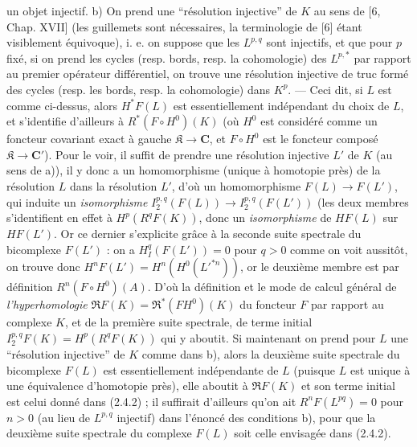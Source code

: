 
\noindent un objet injectif.
b) On prend une ``résolution injective'' de $K$ au sens de [6, Chap. XVII]
(les guillemets sont nécessaires, la terminologie de [6] étant visiblement
équivoque), i. e. on suppose que les $L^{p,q}$ sont injectifs, et que pour $p$
fixé, si on prend les cycles (resp. bords, resp. la cohomologie) des $L^{p,*}$
par rapport au premier opérateur différentiel, on trouve une résolution
injective de truc formé des cycles (resp. les bords, resp. la cohomologie) dans
$K^p$.
--- Ceci dit, si $L$ est comme ci-dessus, alors $H^*F(L)$ est essentiellement
indépendant du choix de $L$, et s'identifie d'ailleurs à
$R^*(F\mathbin{\circ}H^0)(K)$ (où $H^0$ est considéré comme un foncteur
covariant exact à gauche $\mathfrak K\to \mathbf{C}$, et
$F\mathbin{\circ}H^0$ est le foncteur composé
$\mathfrak K\to \mathbf{C}'$). Pour le voir, il suffit de prendre une
résolution injective $L'$ de $K$ (au sens de a)), il y donc a un homomorphisme
(unique à homotopie près) de la résolution $L$ dans la résolution $L'$, d'où
un homomorphisme $F(L)\to F(L')$, qui induite un \textit{isomorphisme}
$I_2^{p,q}(F(L))\to
I_2^{p,q}(F(L'))$
(les deux membres s'identifient en effet à $H^p(R^qF(K))$, donc un
\textit{isomorphisme} de $HF(L)$ sur $HF(L')$. Or ce dernier s'explicite grâce
à la seconde suite spectrale du bicomplexe $F(L')$ : on a
$H_{I}^q(F(L'))=0$ pour $q>0$ comme on voit aussitôt, on trouve donc
$H^nF(L')=H^n(H^0(L'^{*n}))$,
or le deuxième membre est par définition $R^n(F\mathbin{\circ}H^0)(A)$.
D'où la définition et le mode de calcul général de \textit{l'hyperhomologie}
$\mathfrak R F(K)=\mathfrak R^*(FH^0)(K)$ du foncteur $F$ par rapport au
complexe $K$, et de la première suite spectrale, de terme initial
$I_2^{p,q}F(K)=H^p(R^qF(K))$ qui y aboutit.
Si maintenant on prend pour $L$ une ``résolution injective'' de $K$ comme dans
b), alors la deuxième suite spectrale du bicomplexe $F(L)$ est essentiellement
indépendante de $L$ (puisque $L$ est unique à une équivalence d'homotopie
près), elle aboutit à $\mathfrak R F(K)$ et son terme initial est celui donné
dans (2.4.2) ; il suffirait d'ailleurs qu'on ait $R^nF(L^{pq})=0$ pour $n>0$
(au lieu de $L^{p,q}$ injectif) dans l'énoncé des conditions b), pour que la
deuxième suite spectrale du complexe $F(L)$ soit celle envisagée dans (2.4.2).
